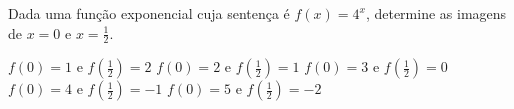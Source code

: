 Dada uma função exponencial cuja sentença é $f(x)=4^x$, determine as imagens de $x=0$ e $x=\frac{1}{2}$.

$f(0)=1$ e $f\left(\frac{1}{2}\right)=2$
$f(0)=2$ e $f\left(\frac{1}{2}\right)=1$
$f(0)=3$ e $f\left(\frac{1}{2}\right)=0$
$f(0)=4$ e $f\left(\frac{1}{2}\right)=-1$
$f(0)=5$ e $f\left(\frac{1}{2}\right)=-2$


